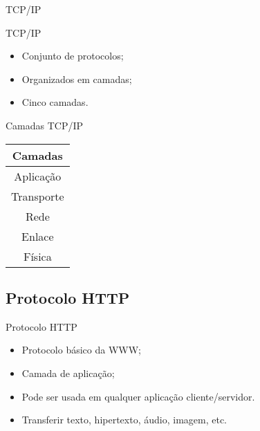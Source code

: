 \begin{frame}{TCP/IP}
	\begin{block}{TCP/IP}
		\begin{itemize}
			\item Conjunto de protocolos; \pause
			\item Organizados em camadas; \pause
			\item Cinco camadas.
		\end{itemize}
	\end{block}
\end{frame}
\begin{frame}
	\begin{block}{Camadas TCP/IP}
			\centering
			\begin{table}
				\begin{tabular}{|c|}
					\hline
					\textbf{Camadas} \\ \hline
					Aplicação \\ \hline
					Transporte \\ \hline
					Rede \\ \hline
					Enlace\\ \hline
					Física\\ \hline
				\end{tabular}
			\end{table}
	\end{block}
\end{frame}


\subsection*{Protocolo HTTP}

\begin{frame}{Protocolo HTTP}
	\begin{itemize}
		\item Protocolo básico da WWW; \pause
		\item Camada de aplicação; \pause
		\item Pode ser usada em qualquer aplicação cliente/servidor. \pause
		\item Transferir texto, hipertexto, áudio, imagem, etc.
	\end{itemize}
\end{frame}
